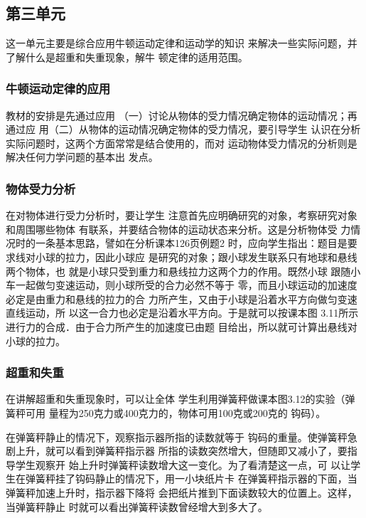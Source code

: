 \subsection{第三单元}
这一单元主要是综合应用牛顿运动定律和运动学的知识
来解决一些实际问题，并了解什么是超重和失重现象，解牛
顿定律的适用范围。

\subsubsection{牛顿运动定律的应用}

教材的安排是先通过应用
（一）讨论从物体的受力情况确定物体的运动情况；再通过应
用（二）从物体的运动情况确定物体的受力情况，要引导学生
认识在分析实际问题时，这两个方面常常是结合使用的，而对
运动物体受力情况的分析则是解决任何力学问题的基本出
发点。

\subsubsection{物体受力分析}

在对物体进行受力分析时，要让学生
注意首先应明确研究的对象，考察研究对象和周围哪些物体
有联系，并要结合物体的运动状态来分析。这是分析物体受
力情况时的一条基本思路，譬如在分析课本126页例题2
时，应向学生指出：题目是要求线对小球的拉力，因此小球应
是研究的对象；跟小球发生联系只有地球和悬线两个物体，也
就是小球只受到重力和悬线拉力这两个力的作用。既然小球
跟随小车一起做匀变速运动，则小球所受的合力必然不等于
零，而且小球运动的加速度必定是由重力和悬线的拉力的合
力所产生，又由于小球是沿着水平方向做匀变速直线运动，所
以这一合力也必定是沿着水平方向。于是就可以按课本图
3.11所示进行力的合成．由于合力所产生的加速度已由题
目给出，所以就可计算出悬线对小球的拉力。

\subsubsection{超重和失重} 在讲解超重和失重现象时，可以让全体
学生利用弹簧秤做课本图3.12的实验（弹簧秤可用
量程为250克力或400克力的，物体可用100克或200克的
钩码）。

在弹簧秤静止的情况下，观察指示器所指的读数就等于
钩码的重量。使弹簧秤急剧上升，就可以看到弹簧秤指示器
所指的读数突然增大，但随即又减小了，要指导学生观察开
始上升时弹簧秤读数增大这一变化。为了看清楚这一点，可
以让学生在弹簧秤挂了钩码静止的情况下，用一小块纸片卡
在弹簧秤指示器的下面，当弹簧秤加速上升时，指示器下降将
会把纸片推到下面读数较大的位置上。这样，当弹簧秤静止
时就可以看出弹簧秤读数曾经增大到多大了。

